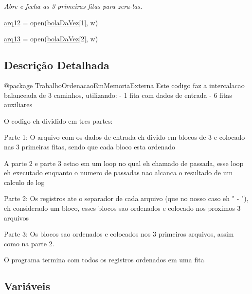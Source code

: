 \begin{DoxyCompactItemize}
\begin{DoxyCompactList}\small\item\em Abre e fecha as 3 primeiras fitas para zera-\/las. \end{DoxyCompactList}\item 
\hyperlink{namespacemain_a3313e71a61224e6a3a7e3b850ef85783}{arq12} = open(\hyperlink{namespacemain_a1a062cd836b3711b8674874524bf97dc}{bola\+Da\+Vez}\mbox{[}1\mbox{]}, \textquotesingle{}w\textquotesingle{})
\item 
\hyperlink{namespacemain_a277d12b6fb93bf74b1dffd24e31fb132}{arq13} = open(\hyperlink{namespacemain_a1a062cd836b3711b8674874524bf97dc}{bola\+Da\+Vez}\mbox{[}2\mbox{]}, \textquotesingle{}w\textquotesingle{})
\end{DoxyCompactItemize}


\subsection{Descrição Detalhada}
\begin{DoxyVerb}@package TrabalhoOrdenacaoEmMemoriaExterna
Este codigo faz a intercalacao balanceada de 3 caminhos, utilizando:
- 1 fita com dados de entrada
- 6 fitas auxiliares

O codigo eh dividido em tres partes:

Parte 1:
O arquivo com os dados de entrada eh divido em blocos de 3 e colocado nas 3 primeiras fitas, sendo que cada bloco esta ordenado

A parte 2 e parte 3 estao em um loop no qual eh chamado de passada, esse loop eh executado enquanto o numero de passadas nao alcanca o resultado de um calculo de log

Parte 2:
Os registros ate o separador de cada arquivo (que no nosso caso eh " - "), eh considerado um bloco, esses blocos sao ordenados e colocado nos proximos 3 arquivos

Parte 3:
Os blocos sao ordenados e colocados nos 3 primeiros arquivos, assim como na parte 2.

O programa termina com todos os registros ordenados em uma fita
\end{DoxyVerb}
 

\subsection{Variáveis}
\mbox{\label{namespacemain_aa164244f9ef98d3941710f56dae766dc}} 
